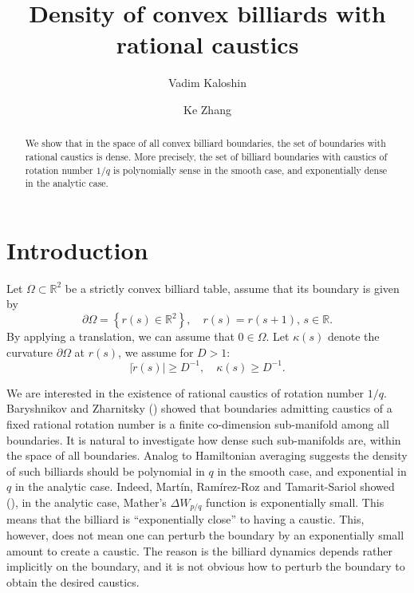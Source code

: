\documentclass[12pt,reqno]{amsart}
\title{Density of convex billiards with rational caustics}
\author{Vadim Kaloshin}
\author{Ke Zhang}
\theoremstyle{remark}
\begin{document}
\maketitle
\begin{abstract}
	We show that in the space of all convex billiard boundaries, the set of boundaries with rational caustics is dense. More precisely, the set of billiard boundaries with caustics of rotation number $1/q$ is polynomially sense in the smooth case, and exponentially dense in the analytic case. 
\end{abstract}

\section{Introduction}

Let $\Omega\subset {\mathbb{R}}^2$ be a strictly convex billiard table, assume that its boundary is given by 
\[
	\partial \Omega = 
	\left\{ r(s) \in {\mathbb{R}}^2 \right\}, \quad r(s) = r(s + 1),\,  s \in {\mathbb{R}}.
\]
By applying a translation, we can assume that $0 \in \Omega$. Let $\kappa(s)$ denote the curvature $\partial\Omega$ at $r(s)$, we assume for $D > 1$:
\begin{equation}
  \label{eq:real-assumption}
  	|\dot{r}(s)| \ge D^{-1}, \quad \kappa(s) \ge D^{-1}. \tag{A1} 
\end{equation}

We are interested in the existence of rational caustics of rotation number $1/q$. Baryshnikov and Zharnitsky (\cite{BZ2006}) showed that boundaries admitting caustics of a fixed rational rotation number is a finite co-dimension sub-manifold among all boundaries. It is natural to investigate how dense such sub-manifolds are, within the space of all boundaries. Analog to Hamiltonian averaging suggests the density of such billiards should be polynomial in $q$ in the smooth case, and exponential in $q$ in the analytic case. Indeed, Mart\'{i}n, Ram\'{i}rez-Roz and Tamarit-Sariol showed (\cite{MRT2016}), in the analytic case, Mather's $\Delta W_{p/q}$ function is exponentially small. This means that the billiard is ``exponentially close'' to having a caustic. This, however, does not mean one can perturb the boundary by an exponentially small amount to create a caustic. The reason is the billiard dynamics depends rather implicitly on the boundary, and it is not obvious how to perturb the boundary to obtain the desired caustics. 
\end{document}
